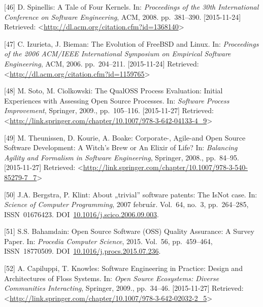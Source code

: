 \documentclass[12pt,magyar,a4paper,oneside]{scrreprt}
\begin{document}
\leavevmode\hypertarget{ref-spinellis_tale_2008}{}%
{[}46{]} D. Spinellis: A Tale of Four Kernels. In: \emph{Proceedings of
the 30th International Conference on Software Engineering}, ACM, 2008.
pp.~381--390. {[}2015-11-24{]} Retrieved:
\textless{}\url{http://dl.acm.org/citation.cfm?id=1368140}\textgreater{}

\leavevmode\hypertarget{ref-izurieta_evolution_2006}{}%
{[}47{]} C. Izurieta, J. Bieman: The Evolution of FreeBSD and Linux. In:
\emph{Proceedings of the 2006 ACM/IEEE International Symposium on
Empirical Software Engineering}, ACM, 2006. pp.~204--211.
{[}2015-11-24{]} Retrieved:
\textless{}\url{http://dl.acm.org/citation.cfm?id=1159765}\textgreater{}

\leavevmode\hypertarget{ref-soto_qualoss_2009}{}%
{[}48{]} M. Soto, M. Ciolkowski: The QualOSS Process Evaluation: Initial
Experiences with Assessing Open Source Processes. In: \emph{Software
Process Improvement}, Springer, 2009., pp.~105--116. {[}2015-11-27{]}
Retrieved:
\textless{}\url{http://link.springer.com/chapter/10.1007/978-3-642-04133-4_9}\textgreater{}

\leavevmode\hypertarget{ref-theunissen_corporate-_2008}{}%
{[}49{]} M. Theunissen, D. Kourie, A. Boake: Corporate-, Agile-and Open
Source Software Development: A Witch's Brew or An Elixir of Life? In:
\emph{Balancing Agility and Formalism in Software Engineering},
Springer, 2008., pp.~84--95. {[}2015-11-27{]} Retrieved:
\textless{}\url{http://link.springer.com/chapter/10.1007/978-3-540-85279-7_7}\textgreater{}

\leavevmode\hypertarget{ref-bergstra_about_2007}{}%
{[}50{]} J.A. Bergstra, P. Klint: About „trivial'' software patents: The
IsNot case. In: \emph{Science of Computer Programming}, 2007 február.
Vol.~64, no.~3, pp.~264--285, ISSN~01676423.
DOI~\href{https://doi.org/10.1016/j.scico.2006.09.003}{10.1016/j.scico.2006.09.003}.

\leavevmode\hypertarget{ref-bahamdain_open_2015}{}%
{[}51{]} S.S. Bahamdain: Open Source Software (OSS) Quality Assurance: A
Survey Paper. In: \emph{Procedia Computer Science}, 2015. Vol.~56,
pp.~459--464, ISSN~18770509.
DOI~\href{https://doi.org/10.1016/j.procs.2015.07.236}{10.1016/j.procs.2015.07.236}.

\leavevmode\hypertarget{ref-capiluppi_software_2009}{}%
{[}52{]} A. Capiluppi, T. Knowles: Software Engineering in Practice:
Design and Architectures of Floss Systems. In: \emph{Open Source
Ecosystems: Diverse Communities Interacting}, Springer, 2009.,
pp.~34--46. {[}2015-11-27{]} Retrieved:
\textless{}\url{http://link.springer.com/chapter/10.1007/978-3-642-02032-2_5}\textgreater{}
\end{document}
